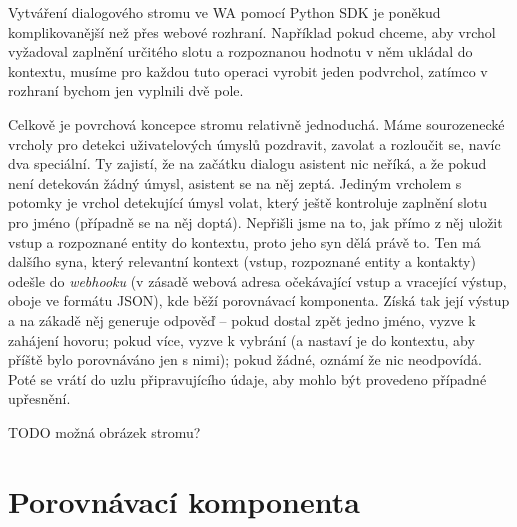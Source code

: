 Vytváření dialogového stromu ve WA pomocí Python SDK je poněkud komplikovanější
než přes webové rozhraní. Například pokud chceme, aby vrchol vyžadoval zaplnění
určitého slotu a rozpoznanou hodnotu v něm ukládal do kontextu, musíme pro
každou tuto operaci vyrobit jeden podvrchol, zatímco v rozhraní bychom jen
vyplnili dvě pole.

Celkově je povrchová koncepce stromu relativně jednoduchá. Máme sourozenecké
vrcholy pro detekci uživatelových úmyslů pozdravit, zavolat a rozloučit se, navíc
dva speciální. Ty zajistí, že na začátku dialogu asistent nic neříká, a že
pokud není detekován žádný úmysl, asistent se na něj zeptá. Jediným vrcholem
s potomky je vrchol detekující úmysl volat, který ještě kontroluje zaplnění slotu
pro jméno (případně se na něj doptá). Nepřišli jsme na to, jak přímo z něj
uložit vstup a rozpoznané entity do kontextu, proto jeho syn dělá právě to. Ten
má dalšího syna, který relevantní kontext (vstup, rozpoznané entity a kontakty)
odešle do \textit{webhooku} (v zásadě webová adresa očekávající vstup a vracející
výstup, oboje ve formátu JSON), kde běží porovnávací komponenta. Získá tak její
výstup a na zákadě něj generuje odpověď -- pokud dostal zpět jedno jméno,
vyzve k zahájení hovoru; pokud více, vyzve k vybrání (a nastaví je do kontextu,
aby příště bylo porovnáváno jen s nimi); pokud žádné, oznámí že nic neodpovídá.
Poté se vrátí do uzlu připravujícího údaje, aby mohlo být provedeno případné
upřesnění.

TODO možná obrázek stromu?

\section{Porovnávací komponenta}

